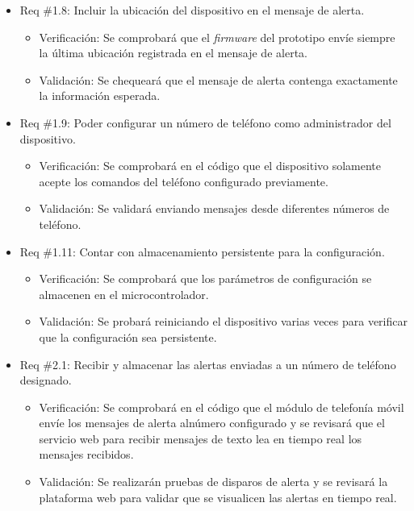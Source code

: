 \documentclass[
11pt, %
]{charter}
\begin{document}
\begin{itemize}
\item Req \#1.8: Incluir la ubicación del dispositivo en el mensaje de alerta.

\begin{itemize}
	\item Verificación: Se comprobará que el \textit{firmware} del prototipo envíe siempre la última ubicación registrada en el mensaje de alerta.
	\item Validación: Se chequeará que el mensaje de alerta contenga exactamente la información esperada.
\end{itemize}

\item Req \#1.9: Poder configurar un número de teléfono como administrador del dispositivo.

\begin{itemize}
	\item Verificación: Se comprobará en el código que el dispositivo solamente acepte los comandos del teléfono configurado previamente.
	\item Validación: Se validará enviando mensajes desde diferentes números de teléfono.
\end{itemize}

\item Req \#1.11: Contar con almacenamiento persistente para la configuración.

\begin{itemize}
	\item Verificación: Se comprobará que los parámetros de configuración se almacenen en el microcontrolador.
	\item Validación: Se probará reiniciando el dispositivo varias veces para verificar que la configuración sea persistente.
\end{itemize}

\item Req \#2.1: Recibir y almacenar las alertas enviadas a un número de teléfono designado.

\begin{itemize}
	\item Verificación: Se comprobará en el código que el módulo de telefonía móvil envíe los mensajes de alerta alnúmero configurado y se revisará que el servicio web para recibir mensajes de texto lea en tiempo real los mensajes recibidos.
	\item Validación: Se realizarán pruebas de disparos de alerta y se revisará la plataforma web para validar que se visualicen las alertas en tiempo real.
\end{itemize}

\end{itemize}
\end{document}
